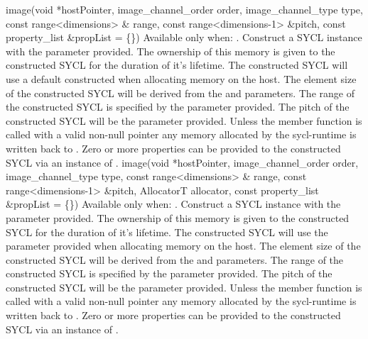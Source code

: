   \addRowSixSL
    {image(void *hostPointer, }
    { image_channel_order order, }
    { image_channel_type type, }
    { const range<dimensions> \& range, }
    { const range<dimensions-1> \&pitch, }
    { const property_list \&propList = \{\}) }
    {
         Available only when: .  
         \newline    
          Construct a SYCL  instance with the  parameter provided. The ownership of this memory is given to the constructed SYCL  for the duration of it's lifetime.
         The constructed SYCL  will use a default constructed  when allocating memory on the host.         
         The element size of the constructed SYCL  will be derived from the  and  parameters.
         The range of the constructed SYCL  is specified by the  parameter provided.
         The pitch of the constructed SYCL  will be the  parameter provided.
         Unless the member function  is called with a valid non-null pointer any memory allocated by the \gls{sycl-runtime} is written back to .
         Zero or more properties can be provided to the constructed SYCL  via an instance of .
    }
  \addRowSevenSL
    {image(void *hostPointer, }
    { image_channel_order order, }
    { image_channel_type type, }
    { const range<dimensions> \& range, }
    { const range<dimensions-1> \&pitch, }
    { AllocatorT allocator, }
    { const property_list \&propList = \{\}) }
    {
         Available only when: .  
         \newline    
         Construct a SYCL  instance with the  parameter provided. The ownership of this memory is given to the constructed SYCL  for the duration of it's lifetime.
         The constructed SYCL  will use the  parameter provided when allocating memory on the host.
         The element size of the constructed SYCL  will be derived from the  and  parameters.
         The range of the constructed SYCL  is specified by the  parameter provided.
         The pitch of the constructed SYCL  will be the  parameter provided.
         Unless the member function  is called with a valid non-null pointer any memory allocated by the \gls{sycl-runtime} is written back to .
         Zero or more properties can be provided to the constructed SYCL  via an instance of .
    }
